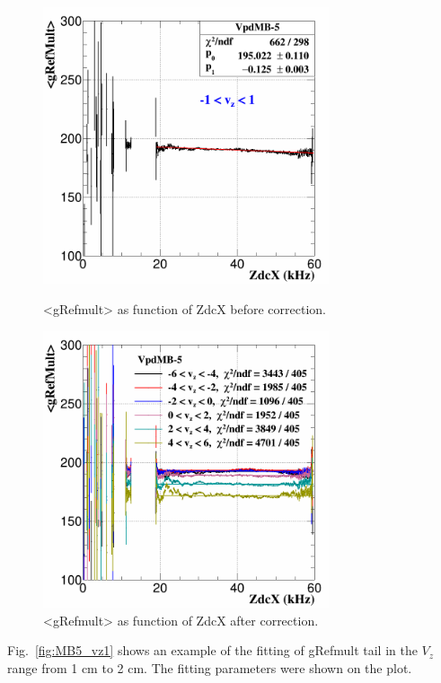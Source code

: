 \documentclass[a4paper]{article}
\begin{document}
\begin{figure}[htbp]
\begin{minipage}[htbp]{0.52\linewidth}
\centering
\includegraphics[width=0.75\textwidth]{fig/MB5_ZDCcor1.png}
\caption{<gRefmult> as function of ZdcX before correction.\label{fig:MB5_zdc1}}
\end{minipage}
\hfill
\begin{minipage}[htbp]{0.52\linewidth}
\centering
\includegraphics[width=0.75\textwidth]{fig/MB5_ZDCcor2.png} 
\caption{<gRefmult> as function of ZdcX after correction.\label{fig:MB5_zdc2}}
\end{minipage}
\end{figure}

Fig.~\ref{fig:MB5_vz1} shows an example of the fitting of gRefmult tail in the $V_{z}$ range from 1 cm to 2 cm. The fitting parameters were shown on the plot.
\end{document}
